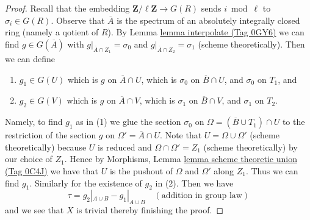 \documentclass{amsart}
\theoremstyle{plain}
\theoremstyle{definition}
\theoremstyle{remark}
\numberwithin{equation}{subsection}
\begin{document}
\begin{proof}
\medskip\noindent
Recall that the embedding $\mathbf{Z}/\ell \mathbf{Z} \to G(R)$
sends $i \bmod \ell$ to $\sigma_i \in G(R)$. Observe that $\overline{A}$
is the spectrum of an absolutely integrally closed ring (namely
a qotient of $R$). By
Lemma \href{https://stacks.math.columbia.edu/tag/0GY6}{lemma interpolate (Tag 0GY6)} we can find $g \in G(\overline{A})$ with
$g|_{\overline{A} \cap Z_1} = \sigma_0$ and
$g|_{\overline{A} \cap Z_2} = \sigma_1$ (scheme theoretically).
Then we can define
\begin{enumerate}
\item $g_1 \in G(U)$ which is $g$ on $\overline{A} \cap U$, which
is $\sigma_0$ on $\overline{B} \cap U$, and $\sigma_0$ on $T_1$, and
\item $g_2 \in G(V)$ which is $g$ on $\overline{A} \cap V$, which
is $\sigma_1$ on $\overline{B} \cap V$, and $\sigma_1$ on $T_2$.
\end{enumerate}
Namely, to find $g_1$ as in (1) we glue the section
$\sigma_0$ on $\Omega = (\overline{B} \cup T_1) \cap U$
to the restriction of the section $g$ on $\Omega' = \overline{A} \cap U$.
Note that $U = \Omega \cup \Omega'$ (scheme theoretically)
because $U$ is reduced and $\Omega \cap \Omega' = Z_1$ (scheme theoretically)
by our choice of $Z_1$. Hence by
Morphisms, Lemma \href{https://stacks.math.columbia.edu/tag/0C4J}{lemma scheme theoretic union (Tag 0C4J)}
we have that $U$ is the pushout of $\Omega$ and $\Omega'$
along $Z_1$. Thus we can find $g_1$.
Similarly for the existence of $g_2$ in (2).
Then we have
$$
\tau = g_2|_{A \cup B} - g_1|_{A \cup B} \quad(\text{addition in group law})
$$
and we see that $X$ is trivial thereby finishing the proof.
\end{proof}
\end{document}
